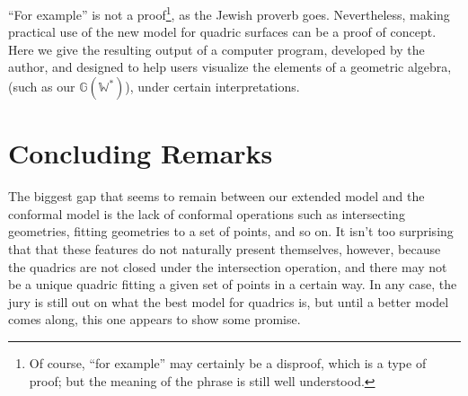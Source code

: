 \documentclass{birkjour}
\theoremstyle{definition}
\theoremstyle{remark}
\numberwithin{equation}{section}
\newcommand{\G}{\mathbb{G}}
\newcommand{\W}{\mathbb{W}}
\begin{document}
``For example'' is not a proof\footnote{Of course, ``for example'' may certainly be a disproof, which
is a type of proof; but the meaning of the phrase is still well understood.},
as the Jewish proverb goes.  Nevertheless, making practical use
of the new model for quadric surfaces can be a proof of concept.  Here we give the resulting
output of a computer program, developed by the author, and designed to help users visualize
the elements of a geometric algebra, (such as our $\G(\W^*)$), under certain
interpretations.

\section{Concluding Remarks}

The biggest gap that seems to remain between our extended model and
the conformal model is the lack of conformal operations such as intersecting geometries, fitting geometries
to a set of points, and so on.  It isn't too surprising that that these features do not
naturally present themselves, however, because the quadrics are not closed under
the intersection operation, and there may not be a unique quadric fitting a given set
of points in a certain way.  In any case, the jury is still out on what the
best model for quadrics is, but until a better model comes along, this one appears
to show some promise.



\end{document}
